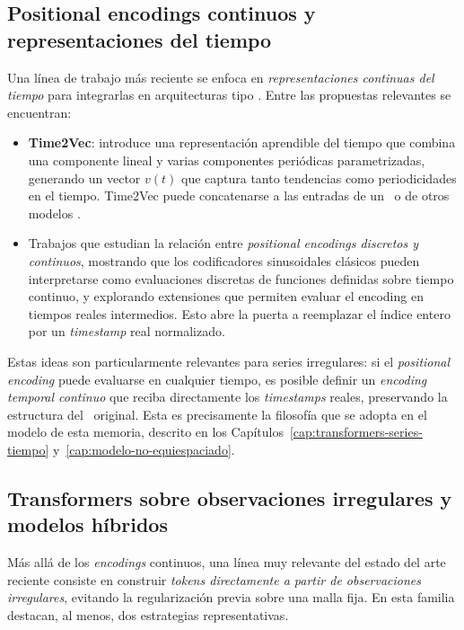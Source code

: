 \subsection{Positional encodings continuos y representaciones del tiempo}

Una línea de trabajo más reciente se enfoca en \textit{representaciones continuas del tiempo} para integrarlas en arquitecturas tipo \Transformer. Entre las propuestas relevantes se encuentran:
\begin{itemize}
    \item \textbf{Time2Vec}: introduce una representación aprendible del tiempo que combina una componente lineal y varias componentes periódicas parametrizadas, generando un vector $v(t)$ que captura tanto tendencias como periodicidades en el tiempo. Time2Vec puede concatenarse a las entradas de un \Transformer\ o de otros modelos \cite{kazemi2019time2vec}.
    \item Trabajos que estudian la relación entre \textit{positional encodings discretos y continuos}, mostrando que los codificadores sinusoidales clásicos pueden interpretarse como evaluaciones discretas de funciones definidas sobre tiempo continuo, y explorando extensiones que permiten evaluar el encoding en tiempos reales intermedios. Esto abre la puerta a reemplazar el índice entero por un \emph{timestamp} real normalizado.
\end{itemize}

Estas ideas son particularmente relevantes para series irregulares: si el \emph{positional encoding} puede evaluarse en cualquier tiempo, es posible definir un \textit{encoding temporal continuo} que reciba directamente los \emph{timestamps} reales, preservando la estructura del \Transformer\ original. Esta es precisamente la filosofía que se adopta en el modelo de esta memoria, descrito en los Capítulos~\ref{cap:transformers-series-tiempo} y~\ref{cap:modelo-no-equiespaciado}.

\subsection{Transformers sobre observaciones irregulares y modelos híbridos}

Más allá de los \emph{encodings} continuos, una línea muy relevante del estado del arte reciente consiste en construir \textit{tokens directamente a partir de observaciones irregulares}, evitando la regularización previa sobre una malla fija. En esta familia destacan, al menos, dos estrategias representativas.

